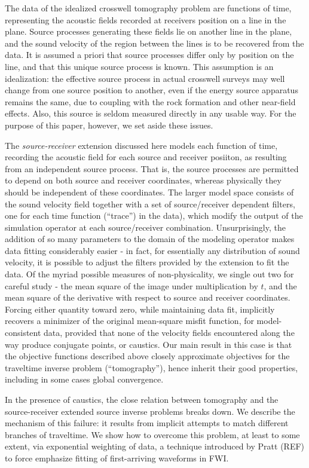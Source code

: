 The data of the idealized crosswell tomography problem
are functions of time, representing the acoustic
fields recorded at receivers position on a line in the plane. Source
processes generating these fields lie on another line in the plane,
and the sound velocity of the region between the lines is to  be
recovered from the data. It is assumed a priori that source processes
differ only by position on the line, and that this unique source
process is known. This assumption is an idealization: the effective
source process in actual crosswell surveys may well change from one
source position to another, even if the energy source apparatus
remains the same, due to coupling with the rock formation and other
near-field effects. Also, this source is seldom measured directly in
any usable way. For the purpose of this paper, however, we set aside
these issues.

The {\em source-receiver} extension discussed here models each
function of time, recording the acoustic field for each source and
receiver posiiton, as resulting from an independent source
process. That is, the source processes are permitted to depend on both
source and receiver coordinates, whereas physically they should be
independent of these coordinates. The larger model space consists of
the sound velocity field together with a set of source/receiver
dependent filters, one for each time function (``trace'') in the
data), which modify the output of the simulation operator at each
source/receiver combination. Unsurprisingly, the addition of so many
parameters to the domain of the modeling operator makes data fitting
considerably easier - in fact, for essentially any distribution of
sound velocity, it is possible to adjust the filters provided by the
extension to fit the data. Of the myriad possible measures of
non-physicality, we single out two for careful study - the mean square
of the image under multiplication by $t$, and the mean square of the derivative with respect to source and
receiver coordinates. Forcing either
quantity toward zero, while maintaining data fit, implicitly recovers a minimizer of the original
mean-square misfit function, for model-consistent data, provided that
none of the velocity fields encountered along the way produce
conjugate points, or caustics. Our main result in this case is that
the objective functions described above closely approximate objectives
for the traveltime inverse problem (``tomography''), hence inherit
their good properties, including in some cases global convergence.  

In the presence of caustics, the close relation between tomography and
the source-receiver extended source inverse problems breaks down. We describe the
mechanism of this failure: it results from implicit attempts to match
different branches of traveltime. We show how to overcome this
problem, at least to some extent, via exponential weighting of data, a
technique introduced by Pratt (REF) to force emphasize fitting of
first-arriving waveforms in FWI.  

